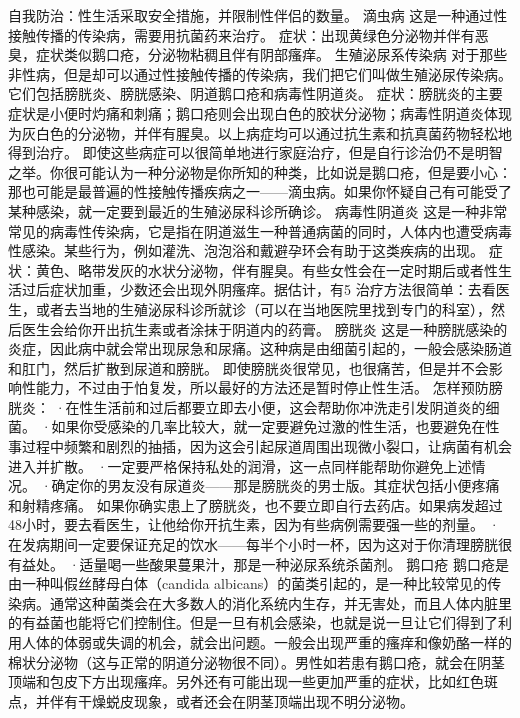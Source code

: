 \documentclass[12pt,UTF8]{ctexbook}
\begin{document}
自我防治：性生活采取安全措施，并限制性伴侣的数量。
滴虫病
这是一种通过性接触传播的传染病，需要用抗菌药来治疗。
症状：出现黄绿色分泌物并伴有恶臭，症状类似鹅口疮，分泌物粘稠且伴有阴部瘙痒。
生殖泌尿系传染病
对于那些非性病，但是却可以通过性接触传播的传染病，我们把它们叫做生殖泌尿传染病。它们包括膀胱炎、膀胱感染、阴道鹅口疮和病毒性阴道炎。
症状：膀胱炎的主要症状是小便时灼痛和刺痛；鹅口疮则会出现白色的胶状分泌物；病毒性阴道炎体现为灰白色的分泌物，并伴有腥臭。以上病症均可以通过抗生素和抗真菌药物轻松地得到治疗。
即使这些病症可以很简单地进行家庭治疗，但是自行诊治仍不是明智之举。你很可能认为一种分泌物是你所知的种类，比如说是鹅口疮，但是要小心：那也可能是最普遍的性接触传播疾病之一——滴虫病。如果你怀疑自己有可能受了某种感染，就一定要到最近的生殖泌尿科诊所确诊。
病毒性阴道炎
这是一种非常常见的病毒性传染病，它是指在阴道滋生一种普通病菌的同时，人体内也遭受病毒性感染。某些行为，例如灌洗、泡泡浴和戴避孕环会有助于这类疾病的出现。
症状：黄色、略带发灰的水状分泌物，伴有腥臭。有些女性会在一定时期后或者性生活过后症状加重，少数还会出现外阴瘙痒。据估计，有5%
治疗方法很简单：去看医生，或者去当地的生殖泌尿科诊所就诊（可以在当地医院里找到专门的科室），然后医生会给你开出抗生素或者涂抹于阴道内的药膏。
膀胱炎
这是一种膀胱感染的炎症，因此病中就会常出现尿急和尿痛。这种病是由细菌引起的，一般会感染肠道和肛门，然后扩散到尿道和膀胱。
即使膀胱炎很常见，也很痛苦，但是并不会影响性能力，不过由于怕复发，所以最好的方法还是暂时停止性生活。
怎样预防膀胱炎：
·在性生活前和过后都要立即去小便，这会帮助你冲洗走引发阴道炎的细菌。
·如果你受感染的几率比较大，就一定要避免过激的性生活，也要避免在性事过程中频繁和剧烈的抽插，因为这会引起尿道周围出现微小裂口，让病菌有机会进入并扩散。
·一定要严格保持私处的润滑，这一点同样能帮助你避免上述情况。
·确定你的男友没有尿道炎——那是膀胱炎的男士版。其症状包括小便疼痛和射精疼痛。
如果你确实患上了膀胱炎，也不要立即自行去药店。如果病发超过48小时，要去看医生，让他给你开抗生素，因为有些病例需要强一些的剂量。
·在发病期间一定要保证充足的饮水——每半个小时一杯，因为这对于你清理膀胱很有益处。
·适量喝一些酸果蔓果汁，那是一种泌尿系统杀菌剂。
鹅口疮
鹅口疮是由一种叫假丝酵母白体（candida albicans）的菌类引起的，是一种比较常见的传染病。通常这种菌类会在大多数人的消化系统内生存，并无害处，而且人体内脏里的有益菌也能将它们控制住。但是一旦有机会感染，也就是说一旦让它们得到了利用人体的体弱或失调的机会，就会出问题。一般会出现严重的瘙痒和像奶酪一样的棉状分泌物（这与正常的阴道分泌物很不同）。男性如若患有鹅口疮，就会在阴茎顶端和包皮下方出现瘙痒。另外还有可能出现一些更加严重的症状，比如红色斑点，并伴有干燥蜕皮现象，或者还会在阴茎顶端出现不明分泌物。
\end{document}
